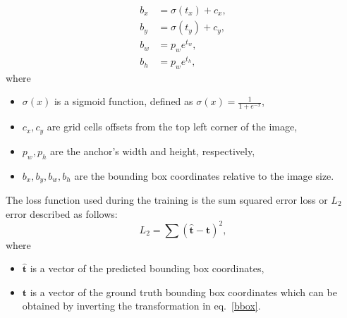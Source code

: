 \documentclass[twoside]{ctuthesis}
\theoremstyle{plain}
\theoremstyle{definition}
\theoremstyle{note}
\begin{document}
\begin{equation}\label{bbox}
	\begin{aligned}
		b_x&=\sigma(t_x)+c_x,\\
		b_y&=\sigma(t_y)+c_y,\\
		b_w&=p_{w}e^{t_w},\\
		b_h&=p_{w}e^{t_h},
	\end{aligned}
\end{equation}
where
\begin{itemize}
	\item $\sigma(x)$ is a sigmoid function, defined as $\sigma(x)=\frac{1}{1+e^{-x}}$,
	\item $c_x, c_y$ are grid cells offsets from the top left corner of the image,
	\item $p_w, p_h$ are the anchor's width and height, respectively,
	\item $b_x, b_y, b_w, b_h$ are the bounding box coordinates relative to the image size.
\end{itemize}
The loss function used during the training is the sum squared error loss or $L_2$ error described as follows:
\begin{equation}
	L_2=\sum(\mathbf{\hat{t}}-\mathbf{t})^2,
\end{equation}
where
\begin{itemize}
	\item $\mathbf{\hat{t}}$ is a vector of the predicted bounding box coordinates,
	\item $\mathbf{t}$ is a vector of the ground truth bounding box coordinates which can be obtained by inverting the transformation in eq.~\eqref{bbox}.
\end{itemize}
\end{document}
